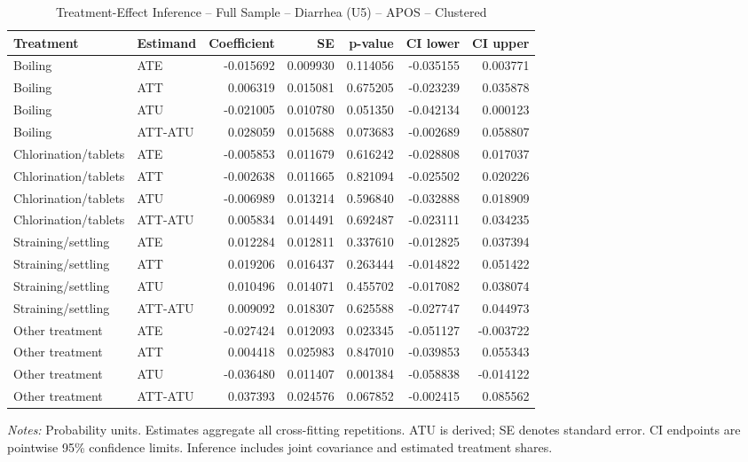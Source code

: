 \begin{table}[htbp]
\centering
\caption{Treatment-Effect Inference -- Full Sample -- Diarrhea (U5) -- APOS -- Clustered}
\label{tab:inference-diarrhea-APOS}
\scriptsize
\begin{adjustbox}{max width=\linewidth}
\begin{tabular}{llrrrrr}
\toprule
Treatment & Estimand & Coefficient & SE & p-value & CI lower & CI upper \\
\midrule
Boiling & ATE & -0.015692 & 0.009930 & 0.114056 & -0.035155 & 0.003771 \\
Boiling & ATT & 0.006319 & 0.015081 & 0.675205 & -0.023239 & 0.035878 \\
Boiling & ATU & -0.021005 & 0.010780 & 0.051350 & -0.042134 & 0.000123 \\
Boiling & ATT-ATU & 0.028059 & 0.015688 & 0.073683 & -0.002689 & 0.058807 \\
Chlorination/tablets & ATE & -0.005853 & 0.011679 & 0.616242 & -0.028808 & 0.017037 \\
Chlorination/tablets & ATT & -0.002638 & 0.011665 & 0.821094 & -0.025502 & 0.020226 \\
Chlorination/tablets & ATU & -0.006989 & 0.013214 & 0.596840 & -0.032888 & 0.018909 \\
Chlorination/tablets & ATT-ATU & 0.005834 & 0.014491 & 0.692487 & -0.023111 & 0.034235 \\
Straining/settling & ATE & 0.012284 & 0.012811 & 0.337610 & -0.012825 & 0.037394 \\
Straining/settling & ATT & 0.019206 & 0.016437 & 0.263444 & -0.014822 & 0.051422 \\
Straining/settling & ATU & 0.010496 & 0.014071 & 0.455702 & -0.017082 & 0.038074 \\
Straining/settling & ATT-ATU & 0.009092 & 0.018307 & 0.625588 & -0.027747 & 0.044973 \\
Other treatment & ATE & -0.027424 & 0.012093 & 0.023345 & -0.051127 & -0.003722 \\
Other treatment & ATT & 0.004418 & 0.025983 & 0.847010 & -0.039853 & 0.055343 \\
Other treatment & ATU & -0.036480 & 0.011407 & 0.001384 & -0.058838 & -0.014122 \\
Other treatment & ATT-ATU & 0.037393 & 0.024576 & 0.067852 & -0.002415 & 0.085562 \\
\bottomrule
\end{tabular}

\end{adjustbox}
\par\smallskip
\begin{minipage}{\linewidth}\scriptsize \textit{Notes:} Probability units. Estimates aggregate all cross-fitting repetitions. ATU is derived; SE denotes standard error. CI endpoints are pointwise 95\% confidence limits. Inference includes joint covariance and estimated treatment shares. \end{minipage}
\end{table}

